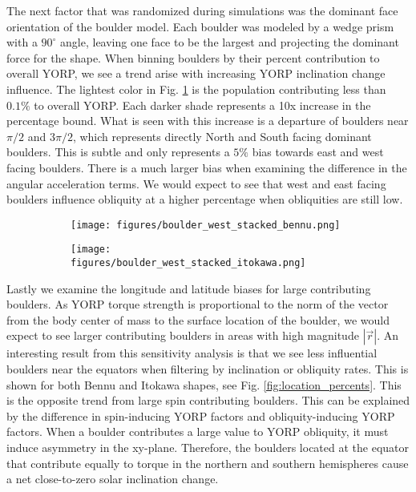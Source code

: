 \documentclass[12pt,notitlepage]{article}
\begin{document}
The next factor that was randomized during simulations was the dominant face orientation of the boulder model. Each boulder was modeled by a wedge prism with a $90^{\circ}$ angle, leaving one face to be the largest and projecting the dominant force for the shape. When binning boulders by their percent contribution to overall YORP, we see a trend arise with increasing YORP inclination change influence. The lightest color in Fig. \ref{fig:west_onepercent} is the population contributing less than $0.1\%$ to overall YORP. Each darker shade represents a 10x increase in the percentage bound. What is seen with this increase is a departure of boulders near $\pi/2$ and $3\pi/2$, which represents directly North and South facing dominant boulders. This is subtle and only represents a $5\%$ bias towards east and west facing boulders. There is a much larger bias when examining the difference in the angular acceleration terms. We would expect to see that west and east facing boulders influence obliquity at a higher percentage when obliquities are still low. 

\begin{figure}[H]
    \begin{subfigure}{0.49\textwidth}
        \centering
        \texttt{[image: figures/boulder\_west\_stacked\_bennu.png]}
        \caption{}
    \end{subfigure}
    \hfill
    \begin{subfigure}{0.49\textwidth}
        \centering
        \texttt{[image: figures/boulder\_west\_stacked\_itokawa.png]}
        \caption{}
    \end{subfigure}  
    \caption{}
    \label{fig:west_onepercent}
\end{figure}

Lastly we examine the longitude and latitude biases for large contributing boulders. As YORP torque strength is proportional to the norm of the vector from the body center of mass to the surface location of the boulder, we would expect to see larger contributing boulders in areas with high magnitude $|\vec{r}|$. An interesting result from this sensitivity analysis is that we see less influential boulders near the equators when filtering by inclination or obliquity rates. This is shown for both Bennu and Itokawa shapes, see Fig. \ref{fig:location_percents}. This is the opposite trend from large spin contributing boulders. This can be explained by the difference in spin-inducing YORP factors and obliquity-inducing YORP factors. When a boulder contributes a large value to YORP obliquity, it must induce asymmetry in the xy-plane. Therefore, the boulders located at the equator that contribute equally to torque in the northern and southern hemispheres cause a net close-to-zero solar inclination change.
\end{document}
